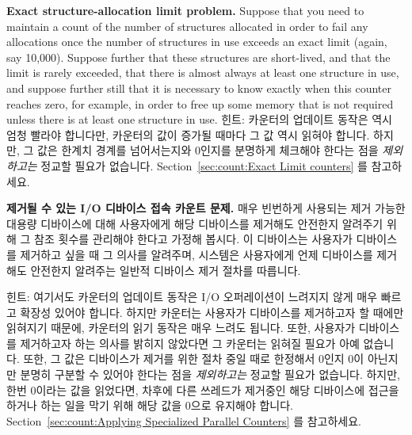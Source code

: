 \begin{enumerate}
	{ \bfseries Exact structure-allocation limit problem. }
	Suppose that you need to maintain a count of the number of
	structures allocated in order to fail any allocations
	once the number of structures in use exceeds an exact limit
	(again, say 10,000).
	Suppose further that these structures are short-lived,
	and that the limit is rarely exceeded, that there is almost
	always at least one structure in use, and suppose further
	still that it is necessary to know exactly when this counter reaches
	zero, for example, in order to free up some memory
	that is not required unless there is at least one structure
	in use.
	\fi
\QuickA{}
	힌트: 카운터의 업데이트 동작은 역시 엄청 빨라야 합니다만, 카운터의 값이
	증가될 때마다 그 값 역시 읽혀야 합니다.
	하지만, 그 값은 한계치 경계를 넘어서는지와 0인지를 분명하게 체크해야
	한다는 점을 \emph{제외하고는} 정교할 필요가 없습니다.
	Section~\ref{sec:count:Exact Limit counters} 를 참고하세요.

\QuickQ{}
	{ \bfseries 제거될 수 있는 I/O 디바이스 접속 카운트 문제. }
	매우 빈번하게 사용되는 제거 가능한 대용량 디바이스에 대해 사용자에게
	해당 디바이스를 제거해도 안전한지 알려주기 위해 그 참조 횟수를 관리해야
	한다고 가정해 봅시다.
	이 디바이스는 사용자가 디바이스를 제거하고 싶을 때 그 의사를 알려주며,
	시스템은 사용자에게 언제 디바이스를 제거해도 안전한지 알려주는 일반적
	디바이스 제거 절차를 따릅니다.

\QuickA{}
	힌트: 여기서도 카운터의 업데이트 동작은 I/O 오퍼레이션이 느려지지 않게
	매우 빠르고 확장성 있어야 합니다. 하지만 카운터는 사용자가 디바이스를
	제거하고자 할 때에만 읽혀지기 때문에, 카운터의 읽기 동작은 매우 느려도
	됩니다.
	또한, 사용자가 디바이스를 제거하고자 하는 의사를 밝히지 않았다면 그
	카운터는 읽혀질 필요가 아예 없습니다.
	또한, 그 값은 디바이스가 제거를 위한 절차 중일 때로 한정해서 0인지 0이
	아닌지만 분명히 구분할 수 있어야 한다는 점을 \emph{제외하고는} 정교할
	필요가 없습니다.
	하지만, 한번 0이라는 값을 읽었다면, 차후에 다른 쓰레드가 제거중인 해당
	디바이스에 접근을 하거나 하는 일을 막기 위해 해당 값을 0으로 유지해야
	합니다.
	Section~\ref{sec:count:Applying Specialized Parallel Counters} 를
	참고하세요.
	\iffalse


\end{enumerate}
